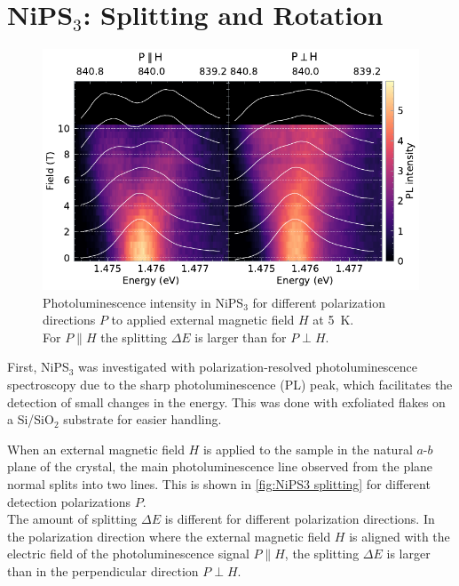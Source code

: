 \documentclass[
	twoside,
	parskip=half,
	a4paper,
]{scrbook}
\begin{document}
\section{NiPS$_3$: Splitting and Rotation}
\begin{figure}
	\centering
	\includegraphics{../figures/2024-04-10 NiPS4 splitting.pdf}
	\caption{
		Photoluminescence intensity in NiPS$_3$ for different polarization directions $P$ to applied external magnetic field $H$ at \SI{5}{K}.\\
		For $P\parallel H$ the splitting $\Delta E$ is larger than for $P\perp H$.
	}
	\label{fig:NiPS3 splitting}
\end{figure}
First, NiPS$_3$ was investigated with polarization-resolved photoluminescence spectroscopy due to the sharp photoluminescence (PL) peak, which facilitates the detection of small changes in the energy.
This was done with exfoliated flakes on a Si/SiO$_2$ substrate for easier handling.

When an external magnetic field $H$ is applied to the sample in the natural $a$-$b$ plane of the crystal, the main photoluminescence line observed from the plane normal splits into two lines.
This is shown in \autoref{fig:NiPS3 splitting} for different detection polarizations $P$.\\
The amount of splitting $\Delta E$ is different for different polarization directions.
In the polarization direction where the external magnetic field $H$ is aligned with the electric field of the photoluminescence signal $P\parallel H$, the splitting $\Delta E$ is larger than in the perpendicular direction $P\perp H$.
\end{document}
